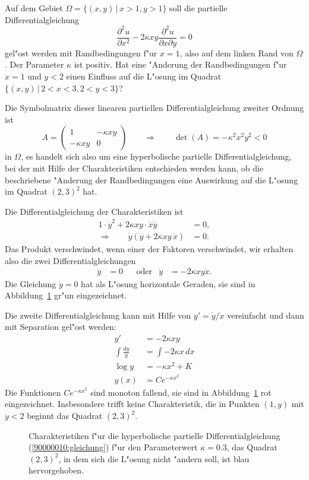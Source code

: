 Auf dem Gebiet $\Omega=\{(x,y)\,|\, x>1, y>1\}$ soll die partielle
Differentialgleichung
\begin{equation}
\frac{\partial^2 u}{\partial x^2}-2\kappa xy\frac{\partial^2 u}{\partial x\partial y}=0
\label{90000010:gleichung}
\end{equation}
gel"ost werden mit Randbedingungen f"ur $x=1$, also auf dem linken Rand von
$\Omega$. Der Parameter $\kappa$ ist positiv.
Hat eine "Anderung der Randbedingungen f"ur $x=1$ und $y<2$ einen
Einfluss auf die L"osung im Quadrat $\{(x,y)\,|\, 2<x<3,2<y<3\}$?

\begin{loesung}
Die Symbolmatrix dieser linearen partiellen Differentialgleichung zweiter
Ordnung ist
\[
A=\begin{pmatrix}
1&-\kappa xy\\
-\kappa xy&0
\end{pmatrix}
\qquad
\Rightarrow
\qquad
\det(A)=-\kappa^2x^2y^2<0
\]
in $\Omega$, es handelt sich also um eine hyperbolische partielle
Differentialgleichung, bei der mit Hilfe der Charakteristiken entschieden
werden kann, ob die beschriebene "Anderung der Randbedingungen eine 
Auswirkung auf die L"osung im Quadrat $(2,3)^2$ hat.

Die Differentialgleichung der Charakteristiken ist
\begin{align*}
1\cdot \dot y^2 +2\kappa xy\cdot \dot x \dot y&=0,\\
\Rightarrow\qquad
\dot y(\dot y+2\kappa xy\,\dot x)&=0.
\end{align*}
Das Produkt verschwindet, wenn einer der Faktoren verschwindet, wir erhalten
also die zwei Differentialgleichungen
\begin{align*}
\dot y &= 0
&
&\text{oder}
&
\dot y&=-2\kappa xy\dot x.
\end{align*}
Die Gleichung $\dot y=0$ hat als L"osung horizontale Geraden, sie sind
in Abbildung~\ref{90000010:bild} gr"un eingezeichnet.

Die zweite Differentialgleichung kann mit Hilfe von $y'=\dot y/\dot x$ 
vereinfacht und dann mit Separation gel"ost werden:
\begin{align*}
y'&=-2\kappa xy\\
\int \frac{dy}y&=\int -2\kappa x\,dx\\
\log y&=-\kappa x^2+K\\
y(x)&=Ce^{-\kappa x^2}
\end{align*}
Die Funktionen $Ce^{-\kappa x^2}$ sind monoton fallend, sie sind in
Abbildung~\ref{90000010:bild} rot eingezeichnet.
Insbesondere trifft
keine Charakteristik, die in Punkten $(1,y)$ mit $y<2$ beginnt das
Quadrat $(2,3)^2$.
\begin{figure}
\begin{center}
\end{center}
\caption{Charakteristiken f"ur die hyperbolische partielle
Differentialgleichung (\ref{90000010:gleichung}) f"ur den Parameterwert
$\kappa =0.3$, das Quadrat $(2,3)^2$, in dem sich die L"osung nicht
"andern soll, ist blau hervorgehoben.
\label{90000010:bild}}
\end{figure}
\end{loesung}


